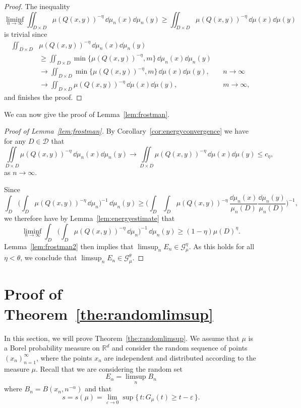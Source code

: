 \begin{proof}
The inequality
\[
\liminf_{n\to \infty} \iint_{D \times D} \mu (Q (x,y))^{-\eta} \,
\dd \mu_n (x) \dd \mu_n (y) \geq \iint_{D \times D} \mu(Q (x,y))^{-\eta} \, \dd\mu (x) \dd \mu (y)
\]
is trivial since
\begin{align*}
\iint_{D \times D} & \mu (Q (x,y))^{-\eta} \, \dd \mu_n (x)
\dd \mu_n (y) \\ & \geq \iint_{D \times D} \min \{ \mu (Q (x,y))^{-\eta}, m \} \, \dd \mu_n (x) \dd \mu_n (y)
\\ &\to \iint_{D \times D} \min \{ \mu (Q (x,y))^{-\eta}, m \} \,
\dd \mu (x) \dd \mu (y), && n \to \infty \\ &\to
\iint_{D \times D} \mu (Q (x,y))^{-\eta} \, \dd \mu (x)
\dd \mu (y), && m \to \infty,
\end{align*}
and finishes the proof.
\end{proof}

We can now give the proof of Lemma~\ref{lem:frostman}.

\begin{proof}[Proof of Lemma~\ref{lem:frostman}]
By Corollary~\ref{cor:energyconvergence} we have for any $D \in
\mathscr{D}$ that
\[
\iint\limits_{D \times D} \mu (Q(x,y))^{-\eta} \, \dd \mu_n (x) \dd \mu_n (y) \to \iint\limits_{D \times D} \mu (Q(x,y))^{-\eta} \, \dd \mu (x) \dd \mu (y) \leq c_\eta,
\]
as $n \to \infty$.

Since
\[
\int_D \biggl(\int_D \mu (Q(x,y))^{-\eta} \, \dd \mu_n
\biggr)^{-1} \, \dd \mu_n (y) \geq \biggl(\int_D \int_D
\mu(Q(x,y))^{-\eta} \, \frac{\dd \mu_n (x)}{\mu_n (D)}
\frac{\dd \mu_n (y)}{\mu_n (D)} \biggr)^{-1},
\]
we therefore have by Lemma~\ref{lem:energyestimate} that
\[
\liminf_{n \to \infty} \int_D \biggl(\int_D \mu (Q(x,y))^{-\eta}
\, \dd \mu_n \biggr)^{-1} \, \dd \mu_n (y)
\geq (1- \eta) \mu (D)^\eta.
\]
Lemma~\ref{lem:frostman2} then implies that $\limsup_n E_n \in
\mathscr{G}_\mu^\eta$. As this holds for all $\eta < \theta$, we conclude that $\limsup_n E_n \in \mathscr{G}_\mu^\theta$.
\end{proof}


\section{Proof of Theorem~\ref{the:randomlimsup}} \label{sec:randomproof}

In this section, we will prove Theorem~\ref{the:randomlimsup}. We assume that $\mu$ is a Borel probability measure on $\mathbb{R}^d$ and consider the random sequence of points $(x_n)_{n=1}^\infty$, where the points $x_n$ are independent and distributed according to the measure $\mu$. Recall that we are considering the random set
\[
E_\alpha = \limsup_n B_n
\]
where $B_n = B(x_n,n^{-\alpha})$ and that
\[
s = s(\mu) = \lim_{\varepsilon \to 0} \sup \{\, t : G_\mu (t) \geq t - \varepsilon \,\}.
\]

